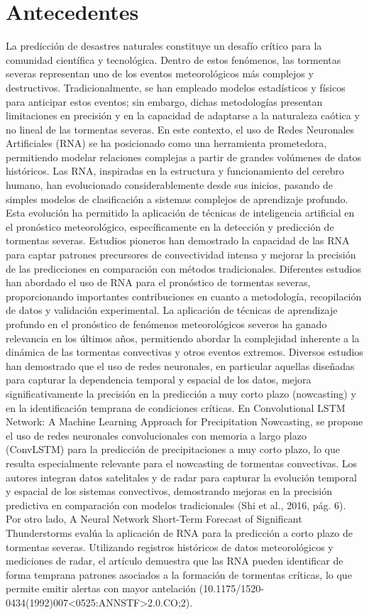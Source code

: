 \documentclass{article}
\begin{document}
\section{Antecedentes}
La predicción de desastres naturales constituye un desafío crítico para la comunidad científica y tecnológica. Dentro de estos fenómenos, las tormentas severas representan uno de los eventos meteorológicos más complejos y destructivos. Tradicionalmente, se han empleado modelos estadísticos y físicos para anticipar estos eventos; sin embargo, dichas metodologías presentan limitaciones en precisión y en la capacidad de adaptarse a la naturaleza caótica y no lineal de las tormentas severas. En este contexto, el uso de Redes Neuronales Artificiales (RNA) se ha posicionado como una herramienta prometedora, permitiendo modelar relaciones complejas a partir de grandes volúmenes de datos históricos. 
Las RNA, inspiradas en la estructura y funcionamiento del cerebro humano, han evolucionado considerablemente desde sus inicios, pasando de simples modelos de clasificación a sistemas complejos de aprendizaje profundo. Esta evolución ha permitido la aplicación de técnicas de inteligencia artificial en el pronóstico meteorológico, específicamente en la detección y predicción de tormentas severas. Estudios pioneros han demostrado la capacidad de las RNA para captar patrones precursores de convectividad intensa y mejorar la precisión de las predicciones en comparación con métodos tradicionales. 
Diferentes estudios han abordado el uso de RNA para el pronóstico de tormentas severas, proporcionando importantes contribuciones en cuanto a metodología, recopilación de datos y validación experimental. La aplicación de técnicas de aprendizaje profundo en el pronóstico de fenómenos meteorológicos severos ha ganado relevancia en los últimos años, permitiendo abordar la complejidad inherente a la dinámica de las tormentas convectivas y otros eventos extremos. Diversos estudios han demostrado que el uso de redes neuronales, en particular aquellas diseñadas para capturar la dependencia temporal y espacial de los datos, mejora significativamente la precisión en la predicción a muy corto plazo (nowcasting) y en la identificación temprana de condiciones críticas. 
En Convolutional LSTM Network: A Machine Learning Approach for Precipitation Nowcasting, se propone el uso de redes neuronales convolucionales con memoria a largo plazo (ConvLSTM) para la predicción de precipitaciones a muy corto plazo, lo que resulta especialmente relevante para el nowcasting de tormentas convectivas. Los autores integran datos satelitales y de radar para capturar la evolución temporal y espacial de los sistemas convectivos, demostrando mejoras en la precisión predictiva en comparación con modelos tradicionales (Shi et al., 2016, pág. 6). 
Por otro lado, A Neural Network Short-Term Forecast of Significant Thunderstorms evalúa la aplicación de RNA para la predicción a corto plazo de tormentas severas. Utilizando registros históricos de datos meteorológicos y mediciones de radar, el artículo demuestra que las RNA pueden identificar de forma temprana patrones asociados a la formación de tormentas críticas, lo que permite emitir alertas con mayor antelación (10.1175/1520-0434(1992)007<0525:ANNSTF>2.0.CO;2). 
 
\end{document}
